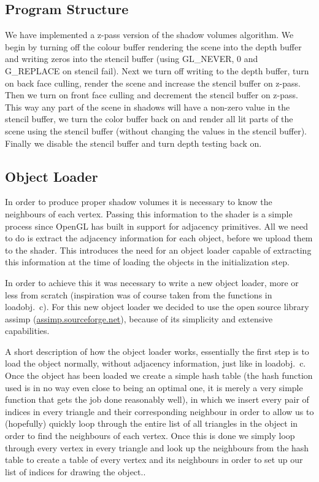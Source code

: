 \documentclass[a4paper, 12pt]{article}
\begin{document}
\subsection{Program Structure}
We have implemented a z-pass version of the shadow volumes algorithm. We begin
by turning off the colour buffer rendering the scene into the depth buffer and
writing zeros into the stencil buffer (using GL\_NEVER, 0 and G\_REPLACE on
stencil fail). Next we turn off writing to the depth buffer, turn on back face
culling, render the scene and increase the stencil buffer on z-pass. Then we
turn on front face culling and decrement the stencil buffer on z-pass. This way
any part of the scene in shadows will have a non-zero value in the stencil
buffer, we turn the color buffer back on and render all lit parts of the scene
using the stencil buffer (without changing the values in the stencil buffer).
Finally we disable the stencil buffer and turn depth testing back on.

\subsection{Object Loader}
In order to produce proper shadow volumes it is necessary to know the neighbours
of each vertex. Passing this information to the shader is a simple process since
OpenGL has built in support for adjacency primitives. All we need to do is
extract the adjacency information for each object, before we upload them to the
shader. This introduces the need for an object loader capable of extracting this
information at the time of loading the objects in the initialization step.

In order to achieve this it was necessary to write a new object loader, more or
less from scratch (inspiration was of course taken from the functions in
loadobj.~c). For this new object loader we decided to use the open source library
assimp (\url{assimp.sourceforge.net}), because of its simplicity and extensive
capabilities.

A short description of how the object loader works, essentially the first step
is to load the object normally, without adjacency information, just like in
loadobj.~c. Once the object has been loaded we create a simple hash table (the
hash function used is in no way even close to being an optimal one, it is merely
a very simple function that gets the job done reasonably well), in which we
insert every pair of indices in every triangle and their corresponding neighbour
in order to allow us to (hopefully) quickly loop through the entire list of all
triangles in the object in order to find the neighbours of each vertex. Once
this is done we simply loop through every vertex in every triangle and look up
the neighbours from the hash table to create a table of every vertex and its
neighbours in order to set up our list of indices for drawing the object..
\end{document}
